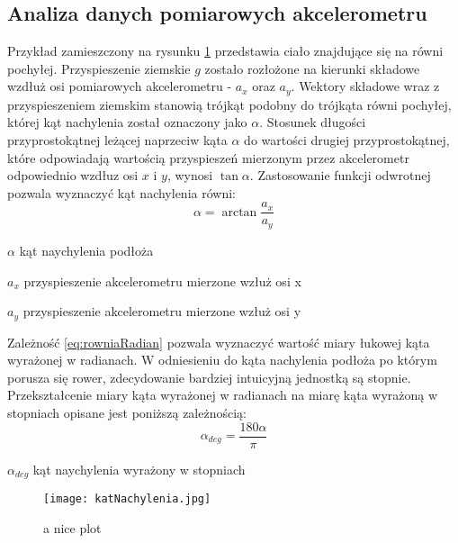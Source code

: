 \subsection{Analiza danych pomiarowych akcelerometru}
\label{pomiaryAkcel}
Przykład zamieszczony na rysunku \ref{fig:równia} przedstawia ciało znajdujące się na równi pochyłej. Przyspieszenie ziemskie \textit{$g$} zostało rozłożone na kierunki składowe wzdłuż osi pomiarowych akcelerometru - \textit{$a_x$} oraz \textit{$a_y$}. Wektory składowe wraz z przyspieszeniem ziemskim stanowią trójkąt podobny do trójkąta równi pochyłej, której kąt nachylenia został oznaczony jako $\alpha$. Stosunek długości przyprostokątnej leżącej naprzeciw kąta $\alpha$ do wartości drugiej przyprostokątnej, które odpowiadają wartością przyspieszeń mierzonym przez akcelerometr odpowiednio wzdłuz osi $x$ i $y$, wynosi $\tan{\alpha}$. Zastosowanie funkcji odwrotnej pozwala wyznaczyć kąt nachylenia równi:
\begin{equation}
    \alpha=\arctan{\frac{a_x}{a_y}}
    \label{eq:rowniaRadian}
\end{equation}
\begin{eqwhere}[2cm]
	\item[$\alpha$] kąt naychylenia podłoża
	\item[$a_x$] przyspieszenie akcelerometru mierzone wzłuż osi x
	\item[$a_y$] przyspieszenie akcelerometru mierzone wzłuż osi y
\end{eqwhere}
Zależność \ref{eq:rowniaRadian} pozwala wyznaczyć wartość miary łukowej kąta wyrażonej w radianach. W odniesieniu do kąta nachylenia podłoża po którym porusza się rower, zdecydowanie bardziej intuicyjną jednostką są stopnie. Przekształcenie miary kąta wyrażonej w radianach na miarę kąta wyrażoną w stopniach opisane jest poniższą zależnością:
\begin{equation}
    \alpha_{deg}=\frac{180\alpha}{\pi}
    \label{eq:rowniaStopnie}
\end{equation}
\begin{eqwhere}[2cm]
	\item[$\alpha_{deg}$] kąt naychylenia wyrażony w stopniach
\end{eqwhere}
\begin{figure}
    \centering
    \texttt{[image: katNachylenia.jpg]}
    \caption{a nice plot}
    \label{fig:równia}
\end{figure}
